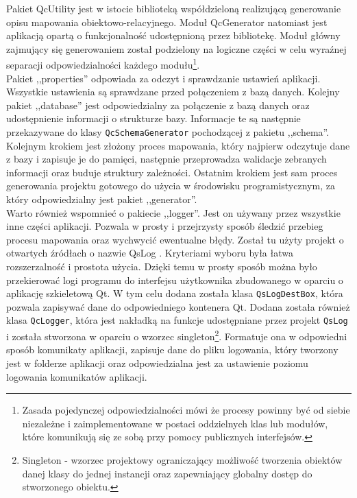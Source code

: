 \documentclass[12pt]{report}
\begin{document}
{\color{black} Pakiet QcUtility jest w istocie biblioteką współdzieloną realizującą generowanie opisu mapowania obiektowo-relacyjnego. Moduł QcGenerator natomiast jest aplikacją opartą o funkcjonalność udostępnioną przez bibliotekę. Moduł główny zajmujący się generowaniem został podzielony na logiczne części w celu wyraźnej separacji odpowiedzialności każdego modułu\footnote{Zasada pojedynczej odpowiedzialności mówi że procesy powinny być od siebie niezależne i zaimplementowane w postaci oddzielnych klas lub modułów, które komunikują się ze sobą przy pomocy publicznych interfejsów.}. \\
\indent Pakiet ,,properties'' odpowiada za odczyt i sprawdzanie ustawień aplikacji. Wszy\-stkie ustawienia są sprawdzane przed połączeniem z bazą danych. Kolejny pakiet ,,database'' jest odpowiedzialny za połączenie z bazą danych oraz udostępnienie informacji o strukturze bazy. Informacje te są następnie przekazywane do klasy {\tt QcSchemaGenerator} pochodzącej z pakietu ,,schema''. Kolejnym krokiem jest złożony proces mapowania, który najpierw odczytuje dane z bazy i zapisuje je do pamięci, następnie przeprowadza walidacje zebranych informacji oraz buduje struktury zależności. Ostatnim krokiem jest sam proces generowania projektu gotowego do użycia w środowisku programistycznym, za który odpowiedzialny jest pakiet ,,generator''. \\ \indent Warto również wspomnieć o pakiecie ,,logger''. Jest on używany przez wszystkie inne części aplikacji. Pozwala w prosty i przejrzysty sposób śledzić przebieg procesu mapowania oraz wychwycić ewentualne błędy. Został tu użyty projekt o otwartych źródłach o nazwie QsLog \cite{qslog}. Kryteriami wyboru była łatwa rozszerzalność i prostota użycia. Dzięki temu w prosty sposób można było przekierować logi programu do interfejsu użytkownika zbudowanego w oparciu o aplikację szkieletową Qt. W tym celu dodana została klasa {\tt QsLogDestBox}, która pozwala zapisywać dane do odpowiedniego kontenera Qt. Dodana została również klasa {\tt QcLogger}, która jest nakładką na funkcje udostępniane przez projekt {\tt QsLog} i została stworzona w oparciu o wzorzec singleton\footnote{Singleton - wzorzec projektowy ograniczający możliwość tworzenia obiektów danej klasy do jednej instancji oraz zapewniający globalny dostęp do stworzonego obiektu.}. Formatuje ona w odpowiedni sposób komunikaty aplikacji, zapisuje dane do pliku logowania, który tworzony jest w folderze aplikacji oraz odpowiedzialna jest za ustawienie poziomu logowania komunikatów aplikacji.}
	
\end{document}
